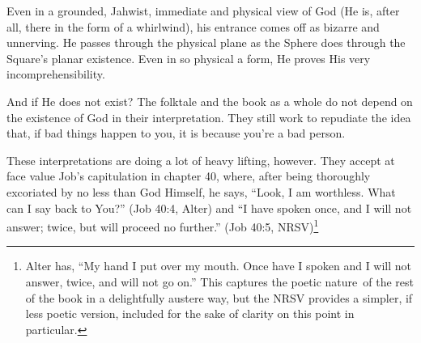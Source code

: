 Even in a grounded, Jahwist, immediate and physical view of God (He is, after all, there in the form of a whirlwind), his entrance comes off as bizarre and unnerving. He passes through the physical plane as the Sphere does through the Square's planar existence. Even in so physical a form, He proves His very incomprehensibility.

And if He does not exist? The folktale and the book as a whole do not depend on the existence of God in their interpretation. They still work to repudiate the idea that, if bad things happen to you, it is because you're a bad person.

These interpretations are doing a lot of heavy lifting, however. They accept at face value Job's capitulation in chapter 40, where, after being thoroughly excoriated by no less than God Himself, he says, ``Look, I am worthless. What can I say back to You?'' (Job 40:4, Alter) and ``I have spoken once, and I will not answer; twice, but will proceed no further.'' (Job 40:5, NRSV)\footnote{Alter has, ``My hand I put over my mouth. Once have I spoken and I will not answer, twice, and will not go on.'' This captures the poetic nature\footnotemark~of the rest of the book in a delightfully austere way, but the NRSV provides a simpler, if less poetic version, included for the sake of clarity on this point in particular.}

